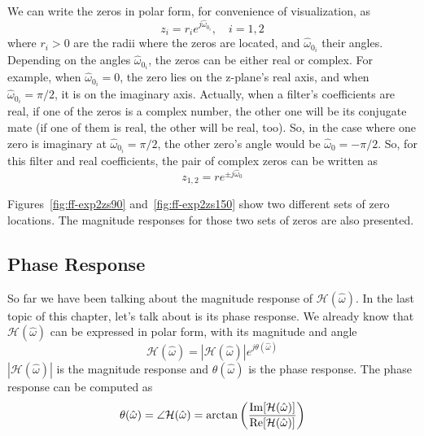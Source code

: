 We can write the zeros in polar form, for convenience of
visualization, as
\begin{equation}
z_{i}=r_i e^{j \hat{\omega}_{0_i}}, \quad i=1,2
\end{equation}
where $r_i>0$ are the radii where the zeros are located, and
$\hat{\omega}_{0_i}$ their angles.  Depending on the angles
$\hat{\omega}_{0_i}$, the zeros can be either real or complex. For
example, when $\hat{\omega}_{0_i}=0$, the zero lies on the z-plane's
real axis, and when $\hat{\omega}_{0_i}=\pi/2$, it is on the imaginary
axis. Actually, when a filter's coefficients are real, if one of the
zeros is a complex number, the other one will be its conjugate mate
(if one of them is real, the other will be real, too).  So, in the
case where one zero is imaginary at $\hat{\omega}_{0_i}=\pi/2$, the
other zero's angle would be $\hat{\omega}_0=-\pi/2$. So, for this
filter and real coefficients, the pair of complex zeros can be written
as
\begin{equation}
z_{1,2}=r e^{\pm j \hat{\omega}_0}
\label{eq:ff-zero}
\end{equation}

Figures~\ref{fig:ff-exp2zs90} and~\ref{fig:ff-exp2zs150} show two
different sets of zero locations. The magnitude responses for
those two sets of zeros are also presented.

\subsection{Phase Response}

So far we have been talking about the magnitude response of
$\mathcal{H}(\hat{\omega})$.  In the last topic of this chapter, let's
talk about is its phase response. We already know that
$\mathcal{H}(\hat{\omega})$ can be expressed in polar form, with its
magnitude and angle
\begin{equation}
\mathcal{H}(\hat{\omega})=|\mathcal{H}(\hat{\omega})|e^{j \theta(\hat{\omega})}
\end{equation}
$|\mathcal{H}(\hat{\omega})|$ is the magnitude response and
$\theta(\hat{\omega})$ is the phase response. The phase response can
be computed as
\begin{equation}
\theta(\hat{\omega}) = \angle\mathcal{H}(\hat{\omega})
 = \arctan\left(\frac{\operatorname{Im}[\mathcal{H}(\hat{\omega})]}{\operatorname{Re}[\mathcal{H}(\hat{\omega})]}\right)
\label{eq:compute-phase-resp}
\end{equation}

